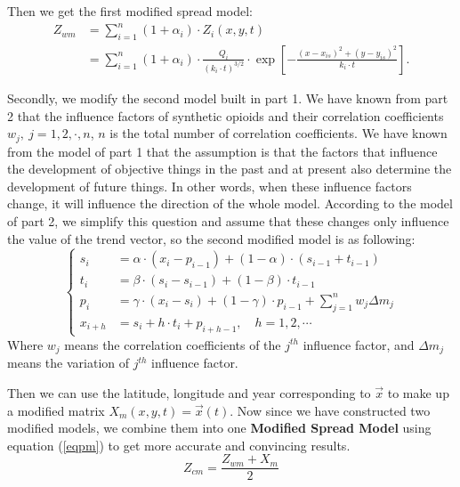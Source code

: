 \documentclass{mcmthesis}
\numberwithin{equation}{section}
\numberwithin{figure}{section}
\numberwithin{table}{section}
\theoremstyle{mydef}
\begin{document}
Then we get the first modified spread model:
\begin{equation}
\begin{aligned}
Z_{wm}&=\sum\limits_{i=1}^n (1+\alpha_i)\cdot Z_i(x,y,t) \\
&=\sum\limits_{i=1}^n (1+\alpha_i)\cdot\frac{Q_i}{(k_i\cdot t)^{3/2}}\cdot \exp{\left[-\frac{(x-x_{is})^2+(y-y_{is})^2}{k_i\cdot t}\right]}.
\label{eqwsmm}
\end{aligned}
\end{equation}

Secondly, we modify the second model built in part 1. We have known from part 2 that the influence factors of synthetic opioids and their correlation coefficients $w_j, \ j=1,2,\cdot,n$, $n$ is the total number of correlation coefficients. We have known from the model of part 1 that the assumption is that the factors that influence the development of objective things in the past and at present also determine the development of future things. In other words, when these influence factors change, it will influence the direction of the whole model. According to the model of part 2, we simplify this question and assume that  these changes only influence the value of the trend vector, so the second modified model is as following:
\begin{equation}
\left\{
\begin{aligned}
s_i&=\alpha \cdot (x_i-p_{i-1})+(1-\alpha)\cdot(s_{i-1}+t_{i-1})\\
t_i&=\beta\cdot(s_i-s_{i-1})+(1-\beta)\cdot t_{i-1}\\
p_i&=\gamma\cdot(x_i-s_i)+(1-\gamma)\cdot p_{i-1}+
\sum\limits_{j=1}^n w_j\Delta m_j\\
x_{i+h}&=s_i+h\cdot t_i+p_{i+h-1}, \quad h = 1,2,\cdots
\end{aligned}
\right.
\end{equation}
Where $w_j$ means the correlation coefficients of the $j^{th}$ influence factor, and $\Delta m_j$ means the variation of $j^{th}$ influence factor. 

Then we can use the latitude, longitude and year corresponding to $\vec{x}$ to make up a modified matrix $X_m(x,y,t)=\vec{x}(t)$. Now since we have constructed two modified models, we combine them into one {\bf{Modified Spread Model}} using equation (\ref{eqpm}) to get more accurate and convincing results.
\begin{equation}
Z_{cm}=\frac{Z_{wm}+X_m}{2}
\label{eqpm}
\end{equation}
\end{document}
